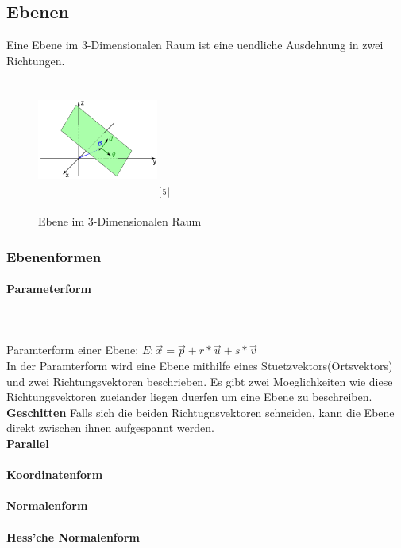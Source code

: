 \documentclass[a4paper]{article} %
\begin{document}
	\subsection{Ebenen}
	Eine Ebene im 3-Dimensionalen Raum ist eine uendliche Ausdehnung in zwei Richtungen.
	\begin{figure}[H]
				\includegraphics[width=150px, height=150px]{Ebene.png}$^{[5]}$
					\captionsetup{labelformat=empty}
				\caption{Ebene im 3-Dimensionalen Raum}
	\end{figure}
	\subsubsection{Ebenenformen}
	\paragraph{Parameterform}
		\hspace{0 cm} \\ \noindent \\
	Paramterform einer Ebene: $E : \vec{x} = \vec{p}+ r*\vec{u}+s*\vec{v}$\\
	In der Paramterform wird eine Ebene mithilfe eines Stuetzvektors(Ortsvektors) und zwei Richtungsvektoren beschrieben.
	Es gibt zwei Moeglichkeiten wie diese Richtungsvektoren zueiander liegen duerfen um eine Ebene zu beschreiben.
	\\\textbf{Geschitten}
	Falls sich die beiden Richtugnsvektoren schneiden, kann die Ebene direkt zwischen ihnen aufgespannt werden.
	\\\textbf{Parallel}
	\paragraph{Koordinatenform}
	\paragraph{Normalenform}
	\paragraph{Hess'che Normalenform}
\end{document}
